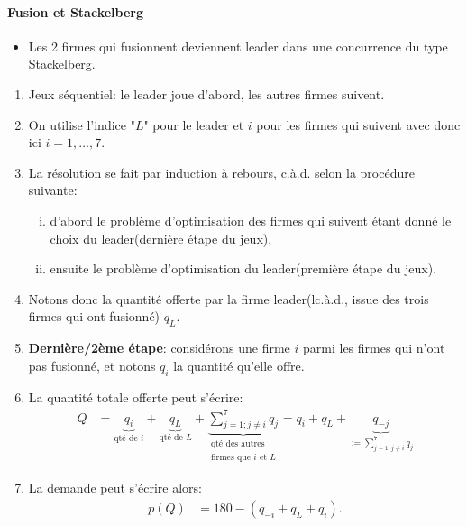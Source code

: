 \documentclass[notes, ignorenonframetext, compress, 10pt, xcolor=svgnames, aspectratio=169]{beamer}
\begin{document}
        \begin{frame}[allowframebreaks]{\insertsection}
            \framesubtitle{Fusion et Stackelberg}
            \begin{itemize}
        \item Les 2 firmes qui fusionnent deviennent leader dans une concurrence du type Stackelberg. 
             \end{itemize}
        \begin{enumerate}[$\star$]
            \item Jeux séquentiel: le leader joue d'abord, les autres firmes suivent. 
            \item On utilise l'indice "$L$" pour le leader et $i$ pour les firmes qui suivent avec donc 
            ici $i=1, \ldots, 7$.
            \item La résolution  se fait par induction à rebours, c.à.d. selon la procédure suivante:
            \begin{enumerate}[(i)]
            \item d'abord le problème d'optimisation des firmes qui suivent étant donné le choix du leader(dernière étape du jeux),
            \item ensuite le problème d'optimisation du leader(première étape du jeux).
            \end{enumerate}
            \item Notons donc la quantité offerte par la firme leader(lc.à.d., issue des trois firmes qui ont fusionné) $q_L$. 
            \item \textbf{Dernière/2ème étape}: considérons une firme $i$ parmi les firmes qui n'ont pas fusionné, 
            et notons $q_i$ la quantité qu'elle offre. 
            \item La quantité totale offerte peut s'écrire:
            \begin{align*}
                Q&= \underbrace{q_i}_{\text{qté de $i$}} + \underbrace{q_L}_{\text{qté de $L$}} 
                + \underbrace{\sum_{j=1; j\neq i}^7 q_j}_{\substack{\text{qté des autres}\\ \text{firmes que $i$ et $L$}}}
                 =  q_i + q_L + \underbrace{q_{-j}}_{:=\sum_{j=1; j\neq i}^7 q_j}
            \end{align*}
            \item La demande peut s'écrire alors:
            \begin{align*}
                p(Q) &= 180 - ( q_{-i} + q_L + q_i ).
            \end{align*}

\end{enumerate}
\end{frame}
\end{document}
